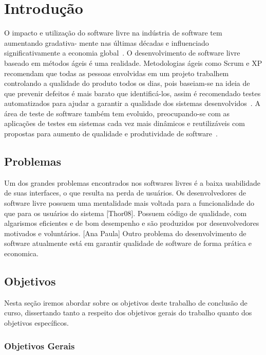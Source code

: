 	\chapter{Introdução}

	O impacto e utilização do software livre na indústria de software tem aumentando gradativa-
	mente nas últimas décadas e influenciado significativamente a economia global~\cite{benkler2006}. 
	O desenvolvimento de software livre baseado em métodos ágeis é uma realidade. Metodologias ágeis 
	como Scrum e XP recomendam que todas as pessoas envolvidas em um projeto trabalhem controlando a 
	qualidade do produto todos os dias, pois baseiam-se na ideia de que prevenir defeitos é mais barato
	que identificá-los, assim é recomendado testes automatizados para ajudar a garantir a qualidade dos 
	sistemas desenvolvidos~\cite{bernardo2011}.
	A área de teste de software também tem evoluido, preocupando-se com as aplicações de testes
	em sistemas cada vez mais dinâmicos e reutilizáveis com propostas para aumento de qualidade e produtividade de software~\cite{vicente2010}.
	\section{Problemas}

	Um dos grandes problemas encontrados nos softwares livres é a baixa usabilidade de suas interfaces, o que resulta na perda de usuários. 
	Os desenvolvedores de software livre possuem uma mentalidade mais voltada para a funcionalidade do que para os usuários do sistema [Thor08]. Possuem código de qualidade, com algarismos eficientes e de bom desempenho e são produzidos por desenvolvedores motivados e voluntários. [Ana Paula] 
	Outro problema do desenvolvimento de software atualmente está em garantir qualidade de software de 
	forma prática e economica.

	\section{Objetivos}

	Nesta seção iremos abordar sobre os objetivos deste trabalho de conclusão de curso, dissertando tanto a respeito dos objetivos gerais do trabalho quanto dos objetivos específicos.

	\subsection{Objetivos Gerais}
	 
